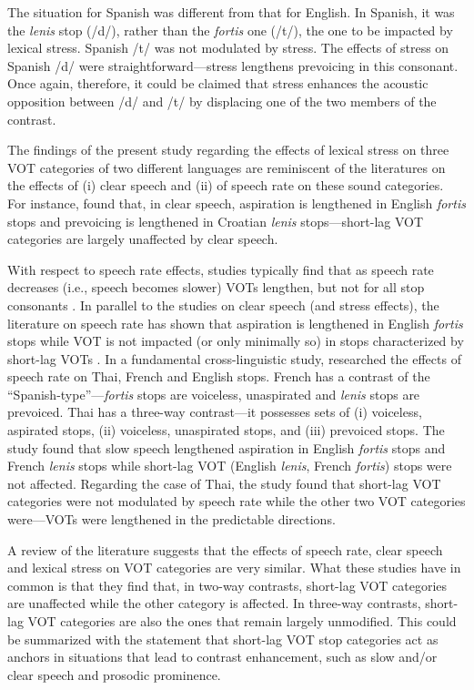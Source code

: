 \documentclass[a4paper]{article}
\begin{document}
The situation for Spanish was different from that for English. In Spanish, it was the \emph{lenis} stop (/d/), rather than the \emph{fortis} one (/t/), the one to be impacted by lexical stress. Spanish /t/ was not modulated by stress. The effects of stress on Spanish /d/ were straightforward---stress lengthens prevoicing in this consonant. Once again, therefore, it could be claimed that stress enhances the acoustic opposition between /d/ and /t/ by displacing one of the two members of the contrast.

The findings of the present study regarding the effects of lexical stress on three VOT categories of two different languages are reminiscent of the literatures on the effects of (i) clear speech and (ii) of speech rate on these sound categories. For instance, \cite{smiljanic2008clear} found that, in clear speech, aspiration is lengthened in English \emph{fortis} stops and prevoicing is lengthened in Croatian \emph{lenis} stops---short-lag VOT categories are largely unaffected by clear speech.

With respect to speech rate effects, studies typically find that as speech rate decreases (i.e., speech becomes slower) VOTs lengthen, but not for all stop consonants \cite{allen1999vot,kessinger1997vot}. In parallel to the studies on clear speech (and stress effects), the literature on speech rate has shown that aspiration is lengthened in English \emph{fortis} stops while VOT is not impacted (or only minimally so) in stops characterized by short-lag VOTs \cite{allen1999vot}. In a fundamental cross-linguistic study, \cite{kessinger1997vot} researched the effects of speech rate on Thai, French and English stops. French has a contrast of the ``Spanish-type''---\emph{fortis} stops are voiceless, unaspirated and \emph{lenis} stops are prevoiced. Thai has a three-way contrast---it possesses sets of (i) voiceless, aspirated stops, (ii) voiceless, unaspirated stops, and (iii) prevoiced stops. The study found that slow speech lengthened aspiration in English \emph{fortis} stops and French \emph{lenis} stops while short-lag VOT (English \emph{lenis}, French \emph{fortis}) stops were not affected. Regarding the case of Thai, the study found that short-lag VOT categories were not modulated by speech rate while the other two VOT categories were---VOTs were lengthened in the predictable directions.

A review of the literature suggests that the effects of speech rate, clear speech and lexical stress on VOT categories are very similar. What these studies have in common is that they find that, in two-way contrasts, short-lag VOT categories are unaffected while the other category is affected. In three-way contrasts, short-lag VOT categories are also the ones that remain largely unmodified. This could be summarized with the statement that short-lag VOT stop categories act as anchors in situations that lead to contrast enhancement, such as slow and/or clear speech and prosodic prominence. 
\end{document}

